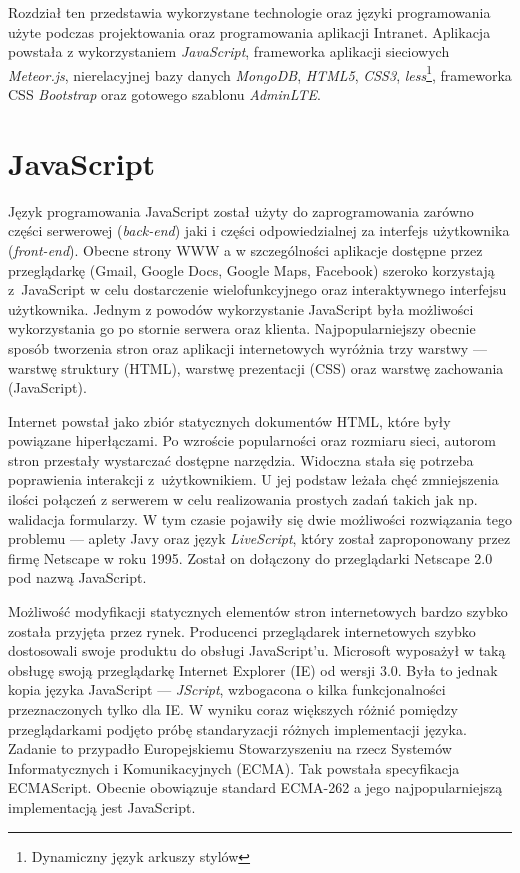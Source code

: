 Rozdział ten przedstawia wykorzystane technologie oraz języki programowania użyte podczas projektowania oraz programowania aplikacji Intranet. Aplikacja powstała z wykorzystaniem \emph{JavaScript}, frameworka aplikacji sieciowych \emph{Meteor.js}, nierelacyjnej bazy danych  \emph{MongoDB}, \emph{HTML5}, \emph{CSS3}, \emph{less}\footnote{Dynamiczny język arkuszy stylów}, frameworka CSS \emph{Bootstrap} oraz gotowego szablonu \emph{AdminLTE}.

\section{JavaScript}

Język programowania JavaScript został użyty do zaprogramowania zarówno części serwerowej (\textit{back-end}) jaki i części odpowiedzialnej za interfejs użytkownika (\textit{front-end}). Obecne strony WWW a w szczególności aplikacje dostępne przez przeglądarkę (Gmail, Google Docs, Google Maps, Facebook) szeroko korzystają z~JavaScript w celu dostarczenie wielofunkcyjnego oraz interaktywnego interfejsu użytkownika. Jednym z powodów wykorzystanie JavaScript była możliwości wykorzystania go po stornie serwera oraz klienta. Najpopularniejszy obecnie sposób tworzenia stron oraz aplikacji internetowych wyróżnia trzy warstwy --- warstwę struktury (HTML), warstwę prezentacji (CSS) oraz warstwę zachowania (JavaScript)\cite{stefanov10}.

Internet powstał jako zbiór statycznych dokumentów HTML, które były powiązane hiperłączami. Po wzroście popularności oraz rozmiaru sieci, autorom stron przestały wystarczać dostępne narzędzia. Widoczna stała się potrzeba poprawienia interakcji z~użytkownikiem. U jej podstaw leżała chęć zmniejszenia ilości połączeń z serwerem w celu realizowania prostych zadań takich jak np. walidacja formularzy. W tym czasie pojawiły się dwie możliwości rozwiązania tego problemu --- aplety Javy oraz język \emph{LiveScript}, który został zaproponowany przez firmę Netscape w roku 1995. Został on dołączony do przeglądarki Netscape 2.0 pod nazwą JavaScript\cite{stefanov10}.  

Możliwość modyfikacji statycznych elementów stron internetowych bardzo szybko została przyjęta przez rynek. Producenci przeglądarek internetowych szybko dostosowali swoje produktu do obsługi JavaScript'u. Microsoft wyposażył w taką obsługę swoją przeglądarkę Internet Explorer (IE) od wersji 3.0. Była to jednak kopia języka JavaScript --- \emph{JScript}, wzbogacona o kilka funkcjonalności przeznaczonych tylko dla IE. W wyniku coraz większych różnić pomiędzy przeglądarkami podjęto próbę standaryzacji różnych implementacji języka. Zadanie to przypadło  Europejskiemu Stowarzyszeniu na rzecz Systemów Informatycznych i Komunikacyjnych (ECMA). Tak powstała specyfikacja ECMAScript. Obecnie obowiązuje standard ECMA-262\cite{ecmascriptWiki} a jego najpopularniejszą implementacją jest JavaScript.  

